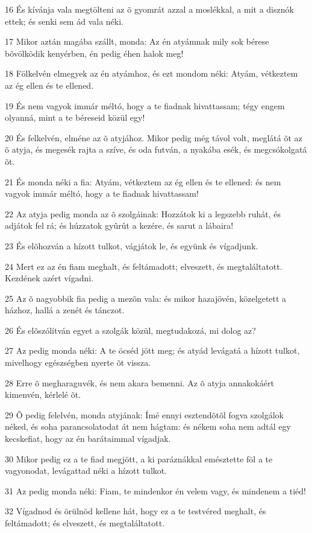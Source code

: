 \par 16 És kívánja vala megtölteni az õ gyomrát azzal a moslékkal, a mit a disznók ettek; és senki sem ád vala néki.
\par 17 Mikor aztán magába szállt, monda: Az én atyámnak mily sok bérese bõvölködik kenyérben, én pedig éhen halok meg!
\par 18 Fölkelvén elmegyek az én atyámhoz, és ezt mondom néki: Atyám, vétkeztem az ég ellen és te ellened.
\par 19 És nem vagyok immár méltó, hogy a te fiadnak hivattassam; tégy engem olyanná, mint a te béreseid közül egy!
\par 20 És felkelvén, elméne az õ atyjához. Mikor pedig még távol volt, meglátá õt az õ atyja, és megesék rajta a szíve, és oda futván, a nyakába esék, és megcsókolgatá õt.
\par 21 És monda néki a fia: Atyám, vétkeztem az ég ellen és te ellened: és nem vagyok immár méltó, hogy a te fiadnak hivattassam!
\par 22 Az atyja pedig monda az õ szolgáinak: Hozzátok ki a legszebb ruhát, és adjátok fel rá; és húzzatok gyûrût a kezére, és sarut a lábaira!
\par 23 És elõhozván a hízott tulkot, vágjátok le, és együnk és vígadjunk.
\par 24 Mert ez az én fiam meghalt, és feltámadott; elveszett, és megtaláltatott. Kezdének azért vígadni.
\par 25 Az õ nagyobbik fia pedig a mezõn vala: és mikor hazajövén, közelgetett a házhoz, hallá a zenét és tánczot.
\par 26 És elõszólítván egyet a szolgák közül, megtudakozá, mi dolog az?
\par 27 Az pedig monda néki: A te öcséd jött meg; és atyád levágatá a hízott tulkot, mivelhogy egészségben nyerte õt vissza.
\par 28 Erre õ megharaguvék, és nem akara bemenni. Az õ atyja annakokáért kimenvén, kérlelé õt.
\par 29 Õ pedig felelvén, monda atyjának: Ímé ennyi esztendõtõl fogva szolgálok néked, és soha parancsolatodat át nem hágtam: és nékem soha nem adtál egy kecskefiat, hogy az én barátaimmal vígadjak.
\par 30 Mikor pedig ez a te fiad megjött, a ki paráznákkal emésztette föl a te vagyonodat, levágattad néki a hízott tulkot.
\par 31 Az pedig monda néki: Fiam, te mindenkor én velem vagy, és mindenem a tiéd!
\par 32 Vígadnod és örülnöd kellene hát, hogy ez a te testvéred meghalt, és feltámadott; és elveszett, és megtaláltatott.

